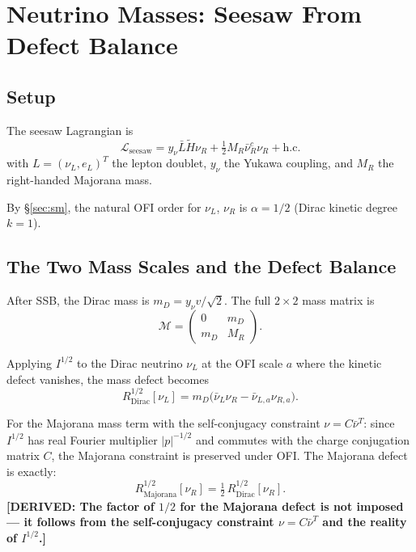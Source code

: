\documentclass[12pt]{article}
\theoremstyle{definition}
\newcommand{\abs}[1]{\left|#1\right|}
\newcommand{\DERIVED}[1]{\textcolor{derivedcolor}{\textbf{[DERIVED: #1]}}}
\begin{document}
\section{Neutrino Masses: Seesaw From Defect Balance}
\label{sec:neutrino}

\subsection{Setup}

The seesaw Lagrangian is
\begin{equation}
  \mathcal{L}_{\mathrm{seesaw}}
  = y_\nu \bar L \tilde H \nu_R + \tfrac{1}{2} M_R \bar\nu_R^c \nu_R
    + \mathrm{h.c.}
\end{equation}
with $L = (\nu_L, e_L)^T$ the lepton doublet, $y_\nu$ the Yukawa coupling,
and $M_R$ the right-handed Majorana mass.

By §\ref{sec:sm}, the natural OFI order for $\nu_L$, $\nu_R$ is $\alpha=1/2$
(Dirac kinetic degree $k=1$).

\subsection{The Two Mass Scales and the Defect Balance}

After SSB, the Dirac mass is $m_D = y_\nu v/\sqrt{2}$.  The full
$2\times 2$ mass matrix is
\begin{equation}
  \mathcal{M} = \begin{pmatrix} 0 & m_D \\ m_D & M_R \end{pmatrix}.
\end{equation}

Applying $I^{1/2}$ to the Dirac neutrino $\nu_L$ at the OFI scale $a$
where the kinetic defect vanishes, the mass defect becomes
\begin{equation}
  R^{1/2}_{\mathrm{Dirac}}[\nu_L]
  = m_D\bigl(\bar\nu_L \nu_R - \bar\nu_{L,a}\nu_{R,a}\bigr).
\end{equation}

For the Majorana mass term with the self-conjugacy constraint $\nu = C\bar\nu^T$:
since $I^{1/2}$ has real Fourier multiplier $\abs{p}^{-1/2}$ and commutes
with the charge conjugation matrix $C$, the Majorana constraint is preserved
under OFI.  The Majorana defect is exactly:
\begin{equation}
  R^{1/2}_{\mathrm{Majorana}}[\nu_R]
  = \tfrac{1}{2}\, R^{1/2}_{\mathrm{Dirac}}[\nu_R].
  \label{eq:majorana_half}
\end{equation}
\DERIVED{The factor of $1/2$ for the Majorana defect is not imposed — it
follows from the self-conjugacy constraint $\nu = C\bar\nu^T$ and the
reality of $I^{1/2}$.}
\end{document}
